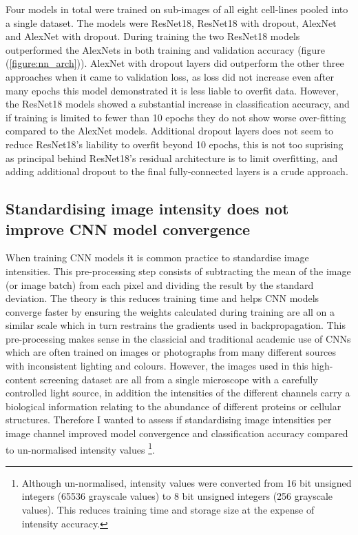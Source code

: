 \documentclass[a4paper,11pt,twoside,openright]{scrbook}
\begin{document}
Four models in total were trained on sub-images of all eight cell-lines pooled into a single dataset.
The models were ResNet18, ResNet18 with dropout, AlexNet and AlexNet with dropout.
During training the two ResNet18 models outperformed the AlexNets in both training and validation accuracy (figure (\ref{figure:nn_arch})).
AlexNet with dropout layers did outperform the other three approaches when it came to validation loss, as loss did not increase even after many epochs this model demonstrated it is less liable to overfit data.
However, the ResNet18 models showed a substantial increase in classification accuracy, and if training is limited to fewer than 10 epochs they do not show worse over-fitting compared to the AlexNet models.
Additional dropout layers does not seem to reduce ResNet18's liability to overfit beyond 10 epochs, this is not too suprising as principal behind ResNet18's residual architecture is to limit overfitting, and adding additional dropout to the final fully-connected layers is a crude approach.



\subsection{Standardising image intensity does not improve CNN model convergence}

When training CNN models it is common practice to standardise image intensities.
This pre-processing step consists of subtracting the mean of the image (or image batch) from each pixel and dividing the result by the standard deviation.
The theory is this reduces training time and helps CNN models converge faster by ensuring the weights calculated during training are all on a similar scale which in turn restrains the gradients used in backpropagation.
This pre-processing makes sense in the classicial and traditional academic use of CNNs which are often trained on images or photographs from many different sources with inconsistent lighting and colours.
However, the images used in this high-content screening dataset are all from a single microscope with a carefully controlled light source, in addition the intensities of the different channels carry a biological information relating to the abundance of different proteins or cellular structures.
Therefore I wanted to assess if standardising image intensities per image channel improved model convergence and classification accuracy compared to un-normalised intensity values
\footnote{Although un-normalised, intensity values were converted from 16 bit unsigned integers (65536 grayscale values) to 8 bit unsigned integers (256 grayscale values).
This reduces training time and storage size at the expense of intensity accuracy.}.
\end{document}
